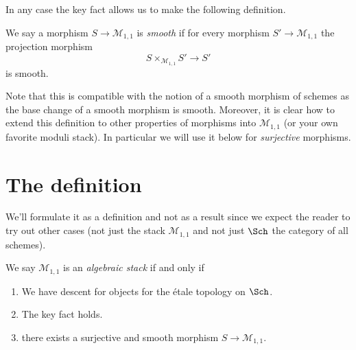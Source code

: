 \noindent
In any case the key fact allows us to make the following definition.

\begin{definition}
\label{definition-smooth}
We say a morphism $S \to \mathcal{M}_{1, 1}$ is {\it smooth} if for every
morphism $S' \to \mathcal{M}_{1, 1}$ the projection morphism
$$
S \times_{\mathcal{M}_{1, 1}} S' \longrightarrow S'
$$
is smooth.
\end{definition}

\noindent
Note that this is compatible with the notion of a smooth morphism
of schemes as the base change of a smooth morphism is smooth.
Moreover, it is clear how to extend this definition to other properties
of morphisms into $\mathcal{M}_{1, 1}$ (or your own favorite moduli stack).
In particular we will use it below for {\it surjective} morphisms.





\section{The definition}
\label{section-definition}

\noindent
We'll formulate it as a definition and not as a result
since we expect the reader to try out other cases (not just
the stack $\mathcal{M}_{1, 1}$ and not just $\Sch$ the category of all
schemes).

\begin{definition}
\label{definition-algebraic-stack}
We say $\mathcal{M}_{1, 1}$ is an {\it algebraic stack} if and only if
\begin{enumerate}
\item We have descent for objects for the \'etale topology on $\Sch$.
\item The key fact holds.
\item there exists a surjective and smooth morphism
$S \to \mathcal{M}_{1, 1}$.
\end{enumerate}
\end{definition}

